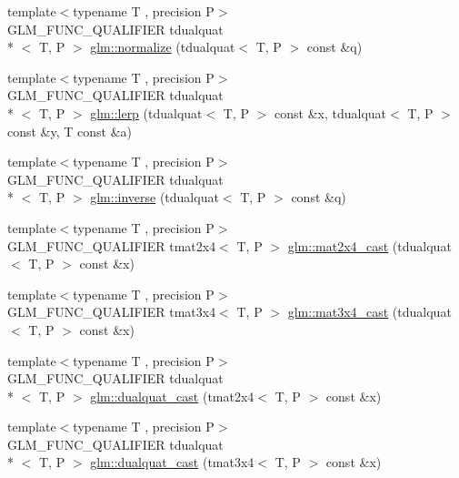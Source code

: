 \begin{DoxyCompactItemize}
\item 
{\footnotesize template$<$typename T , precision P$>$ }\\G\-L\-M\-\_\-\-F\-U\-N\-C\-\_\-\-Q\-U\-A\-L\-I\-F\-I\-E\-R tdualquat\\*
$<$ T, P $>$ \hyperlink{group__gtx__dual__quaternion_ga495818aa48c23e9e730f87a3c337d1d5}{glm\-::normalize} (tdualquat$<$ T, P $>$ const \&q)
\item 
{\footnotesize template$<$typename T , precision P$>$ }\\G\-L\-M\-\_\-\-F\-U\-N\-C\-\_\-\-Q\-U\-A\-L\-I\-F\-I\-E\-R tdualquat\\*
$<$ T, P $>$ \hyperlink{group__gtx__dual__quaternion_ga8039b88397ca09275be924a26a806a59}{glm\-::lerp} (tdualquat$<$ T, P $>$ const \&x, tdualquat$<$ T, P $>$ const \&y, T const \&a)
\item 
{\footnotesize template$<$typename T , precision P$>$ }\\G\-L\-M\-\_\-\-F\-U\-N\-C\-\_\-\-Q\-U\-A\-L\-I\-F\-I\-E\-R tdualquat\\*
$<$ T, P $>$ \hyperlink{group__gtx__dual__quaternion_ga2149d3cb8af04d9530de0cd16aa1aab2}{glm\-::inverse} (tdualquat$<$ T, P $>$ const \&q)
\item 
{\footnotesize template$<$typename T , precision P$>$ }\\G\-L\-M\-\_\-\-F\-U\-N\-C\-\_\-\-Q\-U\-A\-L\-I\-F\-I\-E\-R tmat2x4$<$ T, P $>$ \hyperlink{group__gtx__dual__quaternion_ga2d124748183e12db8288eeaca350298e}{glm\-::mat2x4\-\_\-cast} (tdualquat$<$ T, P $>$ const \&x)
\item 
{\footnotesize template$<$typename T , precision P$>$ }\\G\-L\-M\-\_\-\-F\-U\-N\-C\-\_\-\-Q\-U\-A\-L\-I\-F\-I\-E\-R tmat3x4$<$ T, P $>$ \hyperlink{group__gtx__dual__quaternion_ga576745d979e3c079a64152490c816954}{glm\-::mat3x4\-\_\-cast} (tdualquat$<$ T, P $>$ const \&x)
\item 
{\footnotesize template$<$typename T , precision P$>$ }\\G\-L\-M\-\_\-\-F\-U\-N\-C\-\_\-\-Q\-U\-A\-L\-I\-F\-I\-E\-R tdualquat\\*
$<$ T, P $>$ \hyperlink{group__gtx__dual__quaternion_gada9799afe2b62394dc498534beb5bc78}{glm\-::dualquat\-\_\-cast} (tmat2x4$<$ T, P $>$ const \&x)
\item 
{\footnotesize template$<$typename T , precision P$>$ }\\G\-L\-M\-\_\-\-F\-U\-N\-C\-\_\-\-Q\-U\-A\-L\-I\-F\-I\-E\-R tdualquat\\*
$<$ T, P $>$ \hyperlink{group__gtx__dual__quaternion_ga20eb5758beb73cc6dbc2d9104f03ec20}{glm\-::dualquat\-\_\-cast} (tmat3x4$<$ T, P $>$ const \&x)
\end{DoxyCompactItemize}


